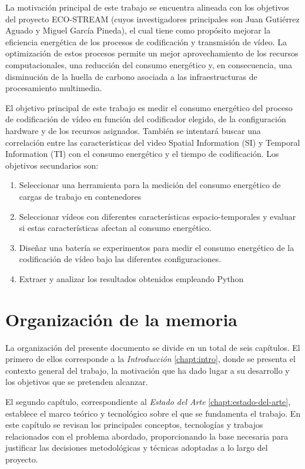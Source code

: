 La motivación principal de este trabajo se encuentra alineada con los objetivos del proyecto ECO-STREAM (cuyos investigadores principales son Juan Gutiérrez Aguado y Miguel García Pineda), el cual tiene como propósito mejorar la eficiencia energética de los procesos de codificación y transmisión de vídeo. La optimización de estos procesos permite un mejor aprovechamiento de los recursos computacionales, una reducción del consumo energético y, en consecuencia, una disminución de la huella de carbono asociada a las infraestructuras de procesamiento multimedia.

El objetivo principal de este trabajo es medir el consumo energético del proceso de codificación de vídeo en función del codificador elegido, de la configuración hardware y de los recursos asignados. También se intentará buscar una correlación entre las características del video Spatial Information (SI) y Temporal Information (TI) con el consumo energético y el tiempo de codificación. Los objetivos secundarios son:

\begin{enumerate} 
 \item Seleccionar una herramienta para la medición del consumo energético de cargas de trabajo en contenedores
 \item Seleccionar vídeos con diferentes características espacio-temporales y evaluar si estas características afectan al consumo energético.
 \item Diseñar una batería se experimentos para medir el consumo energético de la codificación de vídeo bajo las diferentes configuraciones.
 \item Extraer y analizar los resultados obtenidos empleando Python
\end{enumerate}

\section{Organización de la memoria}
La organización del presente documento se divide en un total de seis capítulos. El primero de ellos corresponde a la \textit{Introducción} \ref{chapt:intro}, donde se presenta el contexto general del trabajo, la motivación que ha dado lugar a su desarrollo y los objetivos que se pretenden alcanzar.

 El segundo capítulo, correspondiente al \textit{Estado del Arte} \ref{chapt:estado-del-arte}, establece el marco teórico y tecnológico sobre el que se fundamenta el trabajo. En este capítulo se revisan los principales conceptos, tecnologías y trabajos relacionados con el problema abordado, proporcionando la base necesaria para justificar las decisiones metodológicas y técnicas adoptadas a lo largo del proyecto.

